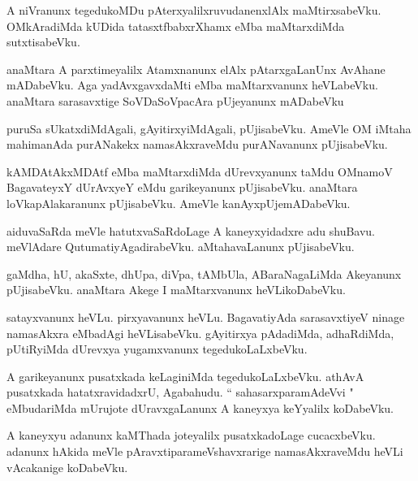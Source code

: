 \documentclass{article}
\begin{document}
\begin{mn}
A  niVranunx  tegedukoMDu  pAterxyalilxruvudanenxlAlx  maMtirxsabeVku.  OMkAradiMda  kUDida  tatasxtfbabxrXhamx  eMba  maMtarxdiMda  sutxtisabeVku.
\end{mn}

\begin{mn}
anaMtara  A  parxtimeyalilx  Atamxnanunx  elAlx  pAtarxgaLanUnx  AvAhane mADabeVku.  Aga  yadAvxgavxdaMti  eMba  maMtarxvanunx  heVLabeVku.  
anaMtara  sarasavxtige  SoVDaSoVpacAra  pUjeyanunx  mADabeVku
\end{mn}

\begin{mn}
puruSa sUkatxdiMdAgali,  gAyitirxyiMdAgali,  pUjisabeVku.  AmeVle  OM  iMtaha  mahimanAda  purANakekx  namasAkxraveMdu  purANavanunx  pUjisabeVku.
\end{mn}

\begin{mn}
kAMDAtAkxMDAtf  eMba  maMtarxdiMda  dUrevxyanunx  taMdu  OMnamoV  BagavateyxY  dUrAvxyeY  eMdu  garikeyanunx  pUjisabeVku.  anaMtara  loVkapAlakaranunx  
pUjisabeVku.  AmeVle  kanAyxpUjemADabeVku. 
\end{mn}

\begin{mn}
aiduvaSaRda  meVle  hatutxvaSaRdoLage  A  kaneyxyidadxre  adu  shuBavu.  meVlAdare  QutumatiyAgadirabeVku.  aMtahavaLanunx  pUjisabeVku.
\end{mn}

\begin{mn}
gaMdha,  hU,  akaSxte,  dhUpa,  diVpa,  tAMbUla,  ABaraNagaLiMda  Akeyanunx  pUjisabeVku.  anaMtara  Akege  I  maMtarxvanunx  heVLikoDabeVku.
\end{mn}

\begin{mn}
satayxvanunx  heVLu.  pirxyavanunx  heVLu.  BagavatiyAda  sarasavxtiyeV  ninage  namasAkxra  eMbadAgi  heVLisabeVku.  gAyitirxya  pAdadiMda,  
adhaRdiMda,  pUtiRyiMda  dUrevxya  yugamxvanunx  tegedukoLaLxbeVku.
\end{mn}

\begin{mn}
A  garikeyanunx  pusatxkada  keLaginiMda  tegedukoLaLxbeVku.  athAvA  pusatxkada  hatatxravidadxrU,  Agabahudu.  `` sahasarxparamAdeVvi "  
eMbudariMda  mUrujote  dUravxgaLanunx  A  kaneyxya  keYyalilx  koDabeVku. 
\end{mn}

\begin{mn}
A kaneyxyu  adanunx  kaMThada  joteyalilx  pusatxkadoLage  cucacxbeVku.  adanunx  hAkida  meVle  pAravxtiparameVshavxrarige  
namasAkxraveMdu heVLi  vAcakanige  koDabeVku.
\end{mn}
\end{document}
